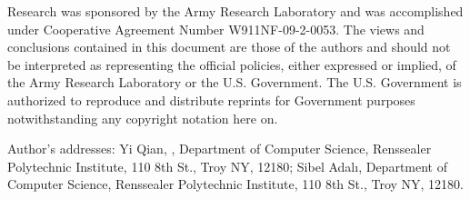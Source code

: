 \documentclass[acmtweb]{acmsmall}
\begin{document}
\begin{bottomstuff}
Research was sponsored by the Army Research Laboratory and was
accomplished under Cooperative Agreement Number W911NF-09-2-0053. The
views and conclusions contained in this document are those of the
authors and should not be interpreted as representing the official
policies, either expressed or implied, of the Army Research Laboratory
or the U.S. Government. The U.S. Government is authorized to reproduce
and distribute reprints for Government purposes notwithstanding any
copyright notation here on.


Author's addresses: 
Yi Qian, , Department of Computer Science, Renssealer Polytechnic Institute, 110 8th St., Troy NY, 12180;
Sibel Adal{\i}, Department of Computer Science, Renssealer Polytechnic Institute, 110 8th St., Troy NY, 12180.
\end{bottomstuff}

\maketitle
\end{document}
